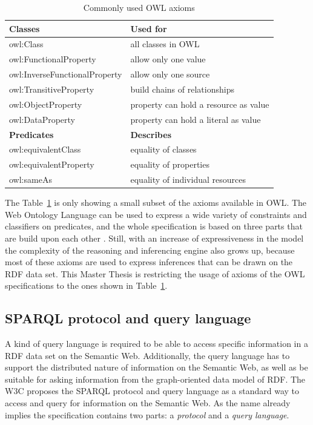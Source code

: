 \begin{table}[H]
\centering
\begin{tabular}{p{5cm}p{7cm}}
\hline
\textbf{Classes} & \textbf{Used for} \\
\hline
owl:Class & all classes in \gls{OWL}  \\
\hline
owl:FunctionalProperty & allow only one value \\
\hline
owl:InverseFunctionalProperty & allow only one source \\
\hline
owl:TransitiveProperty & build chains of relationships \\
\hline
owl:ObjectProperty & property can hold a resource as value \\
\hline
owl:DataProperty & property can hold a literal as value \\
\hline
\textbf{Predicates} & \textbf{Describes} \\
\hline
owl:equivalentClass &	equality of classes \\
\hline
owl:equivalentProperty & equality of properties \\
\hline
owl:sameAs & equality of individual resources \\
\hline
\end{tabular}
\caption[Commonly used \gls{OWL} axioms]{Commonly used \gls{OWL} axioms \citep[pg. 153-185]{allemang2011semantic}}
\label{tab:w3c_vocab_owl}
\end{table}

The Table~\ref{tab:w3c_vocab_owl} is only showing a small subset of the axioms available in \gls{OWL}. The Web Ontology Language can be used to express a wide variety of constraints and classifiers on predicates, and the whole specification is based on three parts that are build upon each other \citep{owlspec}. Still, with an increase of expressiveness in the model the complexity of the reasoning and inferencing engine also grows up, because most of these axioms are used to express inferences that can be drawn on the \gls{RDF} data set. This Master Thesis is restricting the usage of axioms of the \gls{OWL} specifications to the ones shown in Table~\ref{tab:w3c_vocab_owl}.


\subsection{\gls{SPARQL} protocol and query language}
\label{sec:semantic_querylang}

A kind of query language is required to be able to access specific information in a \gls{RDF} data set on the Semantic Web. Additionally, the query language has to support the distributed nature of information on the Semantic Web, as well as be suitable for asking information from the graph-oriented data model of \gls{RDF}. The \gls{W3C} proposes the \gls{SPARQL} protocol and query language as a standard way to access and query for information on the Semantic Web. As the name already implies the specification contains two parts: a \emph{protocol} and a \emph{query language}. \\

